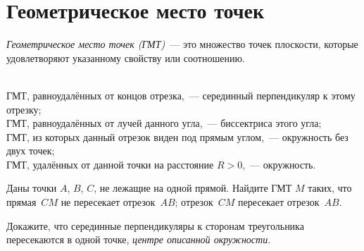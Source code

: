 
\section*{Геометрическое место точек}


\emph{Геометрическое место точек (ГМТ)}~--- это множество точек плоскости,
которые удовлетворяют указанному свойству или соотношению. 

\\
ГМТ, равноудалённых от концов отрезка,~--- серединный перпендикуляр к этому
отрезку;
\\
ГМТ, равноудалённых от лучей данного угла,~--- биссектриса этого угла;
\\
ГМТ, из которых данный отрезок виден под прямым углом,~--- окружность без двух
точек;
\\
ГМТ, удалённых от данной точки на расстояние $R > 0$,~--- окружность. 

Даны точки $A$, $B$, $C$, не лежащие на одной прямой.
Найдите ГМТ $M$ таких, что
\\
\subproblem
прямая~$CM$ не пересекает отрезок~$AB$;
\quad
\subproblem
отрезок~$CM$ пересекает отрезок~$AB$.

Докажите, что серединные перпендикуляры к сторонам треугольника пересекаются
в одной точке, \emph{центре описанной окружности}.

